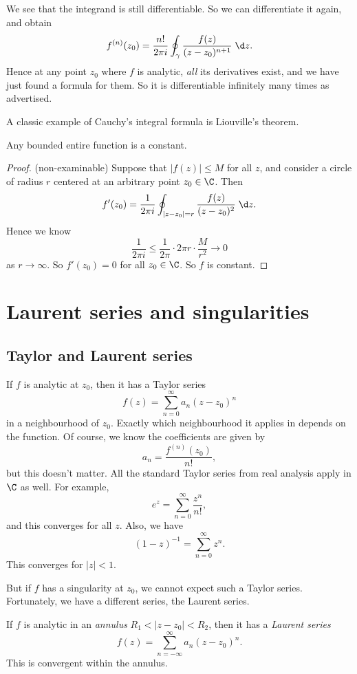 \documentclass[a4paper]{article}
\begin{document}
We see that the integrand is still differentiable. So we can differentiate it again, and obtain
\[
  f^{(n)}(z_0) = \frac{n!}{2\pi i} \oint_{\gamma} \frac{f(z)}{(z - z_0)^{n + 1}}\;\d z.
\]
Hence at any point $z_0$ where $f$ is analytic, \emph{all} its derivatives exist, and we have just found a formula for them. So it is differentiable infinitely many times as advertised.

A classic example of Cauchy's integral formula is Liouville's theorem.
\begin{thm}
  Any bounded entire function is a constant.
\end{thm}

\begin{proof}(non-examinable)
  Suppose that $|f(z)| \leq M$ for all $z$, and consider a circle of radius $r$ centered at an arbitrary point $z_0 \in \C$. Then
  \[
    f'(z_0) = \frac{1}{2\pi i} \oint_{|z - z_0| = r} \frac{f(z)}{(z - z_0)^2}\;\d z.
  \]
  Hence we know
  \[
    \frac{1}{2\pi i} \leq \frac{1}{2\pi} \cdot 2\pi r \cdot \frac{M}{r^2} \to 0
  \]
  as $r \to \infty$. So $f'(z_0) = 0$ for all $z_0 \in \C$. So $f$ is constant.
\end{proof}

\section{Laurent series and singularities}
\subsection{Taylor and Laurent series}
If $f$ is analytic at $z_0$, then it has a Taylor series
\[
  f(z) = \sum_{n = 0}^\infty a_n (z - z_0)^n
\]
in a neighbourhood of $z_0$. Exactly which neighbourhood it applies in depends on the function. Of course, we know the coefficients are given by
\[
  a_n = \frac{f^{(n)}(z_0)}{n!},
\]
but this doesn't matter. All the standard Taylor series from real analysis apply in $\C$ as well. For example,
\[
  e^z = \sum_{n = 0}^\infty \frac{z^n}{n!},
\]
and this converges for all $z$. Also, we have
\[
  (1 - z)^{-1} = \sum_{n = 0}^\infty z^n.
\]
This converges for $|z| < 1$.

But if $f$ has a singularity at $z_0$, we cannot expect such a Taylor series. Fortunately, we have a different series, the Laurent series.
\begin{prop}
  If $f$ is analytic in an \emph{annulus} $R_1 < |z - z_0| < R_2$, then it has a \emph{Laurent series}
  \[
    f(z) = \sum_{n = -\infty}^\infty a_n (z - z_0)^n.
  \]
  This is convergent within the annulus.
\end{prop}
\end{document}
